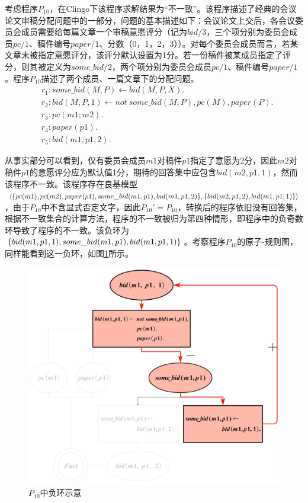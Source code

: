 \begin{example}
    考虑程序$P_{10}$，在Clingo下该程序求解结果为“不一致”。该程序描述了经典的会议论文审稿分配问题中的一部分，问题的基本描述如下：会议论文上交后，各会议委员会成员需要给每篇文章一个审稿意愿评分（记为$bid/3$，三个项分别为委员会成员$pc/1$、稿件编号$paper/1$、分数（0，1，2，3））。对每个委员会成员而言，若某文章未被指定意愿评分，该评分默认设置为1分。若一份稿件被某成员指定了评分，则其被定义为$some\_bid/2$，两个项分别为委员会成员$pc/1$、稿件编号$paper/1$。程序$P_{10}$描述了两个成员、一篇文章下的分配问题。
    \begin{align*}
        \label{prg:p10}
        &r_1: some\_bid(M, P) \leftarrow bid(M, P, X). \\
        &r_2: bid(M, P, 1) \leftarrow not\ some\_bid(M, P), pc(M), paper(P).\\
        &r_3: pc(m1;m2).\\
        &r_4: paper(p1).\\
        &r_5: bid(m1,p1,2).
    \end{align*}
    
    从事实部分可以看到，仅有委员会成员$m1$对稿件$p1$指定了意愿为2分，因此$m2$对稿件$p1$的意愿评分应为默认值1分，期待的回答集中应包含$bid(m2, p1, 1)$，然而该程序不一致。该程序存在良基模型$\langle \{pc(m1), pc(m2), paper(p1), some\_bid(m1,p1), bid(m1, p1,\\2)\},\{bid(m2,p1,2), bid(m1, p1, 1)\}\rangle$，由于$P_{10}$中不含显式否定文字，因此$P_{10}'=P_{10}$，转换后的程序依旧没有回答集，根据不一致集合的计算方法，程序的不一致被归为第四种情形，即程序中的负奇数环导致了程序的不一致。该负环为$\{bid(m1, p1, 1), some\_bid(m1,\\ p1), bid(m1, p1, 1)\}$。考察程序$P_{10}$的原子-规则图，同样能看到这一负环，如图\ref{fig:negcyclep10}所示。
    \begin{figure}[!h]
    \centering
    \includegraphics[height=.6\textwidth, valign=c]{figures/pc-incst例子.jpg}
    \caption{$P_{10}$中负环示意}
    \label{fig:negcyclep10}
\end{figure}
    

\end{example}
